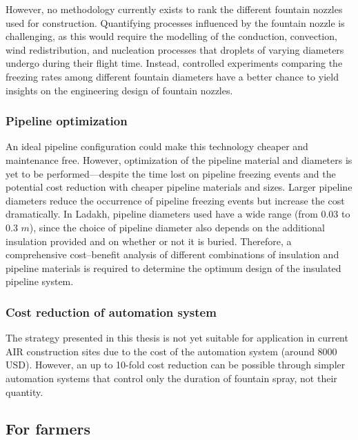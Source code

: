 However, no methodology currently exists to rank the different fountain nozzles used for construction. Quantifying
processes influenced by the fountain nozzle is challenging, as this would require the modelling of the conduction,
convection, wind redistribution, and nucleation processes that droplets of varying diameters undergo during
their flight time. Instead, controlled experiments comparing the freezing rates among different fountain
diameters have a better chance to yield insights on the engineering design of fountain nozzles.

\subsubsection{Pipeline optimization}

An ideal pipeline configuration could make this technology cheaper and maintenance free. However, optimization
of the pipeline material and diameters is yet to be performed---despite the time lost on pipeline freezing
events and the potential cost reduction with cheaper pipeline materials and sizes. Larger pipeline diameters
reduce the occurrence of pipeline freezing events but increase the cost dramatically. In Ladakh, pipeline
diameters used have a wide range (from 0.03 to 0.3 $m$), since the choice of pipeline diameter also depends on
the additional insulation provided and on whether or not it is buried. Therefore, a comprehensive cost--benefit
analysis of different combinations of insulation and pipeline materials is required to determine the optimum
design of the insulated pipeline system.

\subsubsection{Cost reduction of automation system}

The strategy presented in this thesis is not yet suitable for application in current AIR construction sites due to the cost of the
automation system (around 8000 USD). However, an up to 10-fold cost reduction can be possible through
simpler automation systems that control only the duration of fountain spray, not their quantity. 

\subsection{For farmers}

